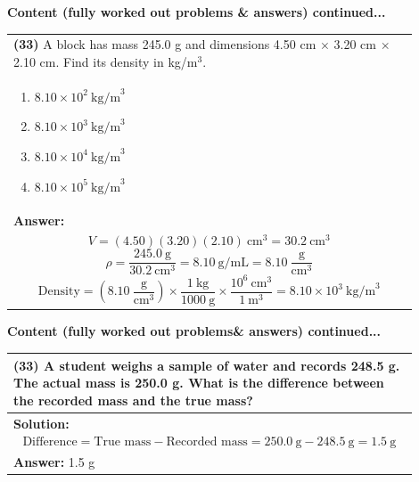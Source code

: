 \documentclass{article}
\begin{document}
\newpage
\noindent
{\large\textbf{Content (fully worked out problems \& answers) continued...}}\\[0.2em]
\vspace{0.2cm}
\begin{tabular}{|p{0.9\linewidth}|}
\hline
\vspace{0.2cm}
\textbf{(33)} A block has mass 245.0 g and dimensions 4.50 cm $\times$ 3.20 cm $\times$ 2.10 cm. Find its density in kg/m$^3$.\\
\begin{minipage}[t]{0.85\linewidth}
\begin{enumerate}[label=\alph*.]
   \item $8.10\times10^{2}~\text{kg/m}^3$
   \item $8.10\times10^{3}~\text{kg/m}^3$
   \item $8.10\times10^{4}~\text{kg/m}^3$
   \item $8.10\times10^{5}~\text{kg/m}^3$
\end{enumerate}
\end{minipage}\\
\hline
\vspace{0.2cm}
\textbf{Answer:}\\
\[
V=(4.50)(3.20)(2.10)~\text{cm}^3=30.2~\text{cm}^3
\]
\[
\rho=\frac{245.0~\text{g}}{30.2~\text{cm}^3}=8.10~\text{g/mL}=8.10~\frac{\text{g}}{\text{cm}^3}
\]
\[
\text{Density}=\left(8.10~\frac{\text{g}}{\text{cm}^3}\right)\times\frac{1~\text{kg}}{1000~\text{g}}\times\frac{10^6~\text{cm}^3}{1~\text{m}^3}=8.10\times10^{3}~\text{kg/m}^3
\] \\
\hline
\end{tabular}

\newpage
\noindent
{\large\textbf{Content (fully worked out problems& answers) continued...}}\\
\vspace{0.2cm}
\begin{tabular}{|p{0.9\linewidth}|}
\hline
\vspace{0.2cm}
\textbf{(33)} A student weighs a sample of water and records 248.5 g. The actual mass is 250.0 g. What is the difference between the recorded mass and the true mass?\\
\hline
\vspace{0.2cm}
\textbf{Solution:} \\

\[
\text{Difference} = \text{True mass} - \text{Recorded mass} = 250.0~\text{g} - 248.5~\text{g} = 1.5~\text{g}
\] \\ 
\hline
\vspace{0.2cm}
\textbf{Answer:} 1.5 g \\
\hline
\end{tabular}
\end{document}

